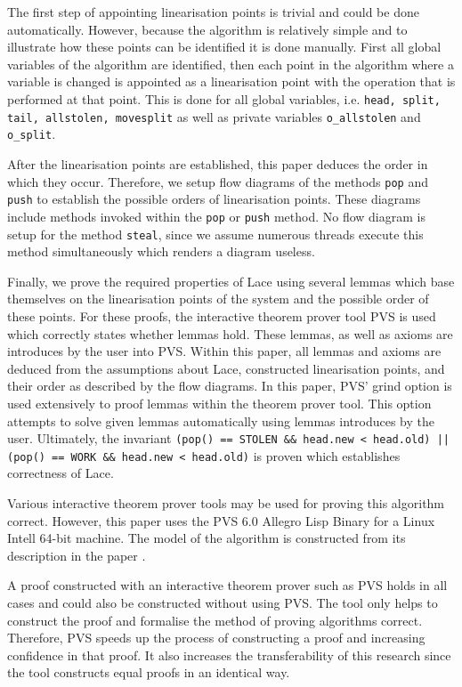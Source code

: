 \documentclass{sig-alternate-br}
\begin{document}
The first step of appointing linearisation points is trivial and could be done automatically.
However, because the algorithm is relatively simple and to illustrate how these points can be identified it is done manually.
First all global variables of the algorithm are identified, then each point in the algorithm where a variable is changed is appointed as a linearisation point with the operation that is performed at that point.
This is done for all global variables, i.e. \texttt{head, split, tail, allstolen, movesplit} as well as private variables \texttt{o\_allstolen} and \texttt{o\_split}.

After the linearisation points are established, this paper deduces the order in which they occur.
Therefore, we setup flow diagrams of the methods \texttt{pop} and \texttt{push} to establish the possible orders of linearisation points.
These diagrams include methods invoked within the \texttt{pop} or \texttt{push} method.
No flow diagram is setup for the method \texttt{steal}, since we assume numerous threads execute this method simultaneously which renders a diagram useless.

Finally, we prove the required properties of Lace using several lemmas which base themselves on the linearisation points of the system and the possible order of these points.
For these proofs, the interactive theorem prover tool PVS\cite{owre1992pvs} is used which correctly states whether lemmas hold.
These lemmas, as well as axioms are introduces by the user into PVS.
Within this paper, all lemmas and axioms are deduced from the assumptions about Lace, constructed linearisation points, and their order as described by the flow diagrams.
In this paper, PVS' grind option\cite{PVSProverGuide} is used extensively to proof lemmas within the theorem prover tool.
This option attempts to solve given lemmas automatically using lemmas introduces by the user.
Ultimately, the invariant \texttt{(pop() == STOLEN \&\& head.new < head.old) || (pop() == WORK \&\& head.new < head.old)} is proven which establishes correctness of Lace.

Various interactive theorem prover tools may be used for proving this algorithm correct.
However, this paper uses the PVS 6.0 Allegro Lisp Binary for a Linux Intell 64-bit machine.
The model of the algorithm is constructed from its description in the paper \cite{vanDijk2014206}.

A proof constructed with an interactive theorem prover such as PVS holds in all cases and could also be constructed without using PVS.
The tool only helps to construct the proof and formalise the method of proving algorithms correct.
Therefore, PVS speeds up the process of constructing a proof and increasing confidence in that proof.
It also increases the transferability of this research since the tool constructs equal proofs in an identical way.
\end{document}
